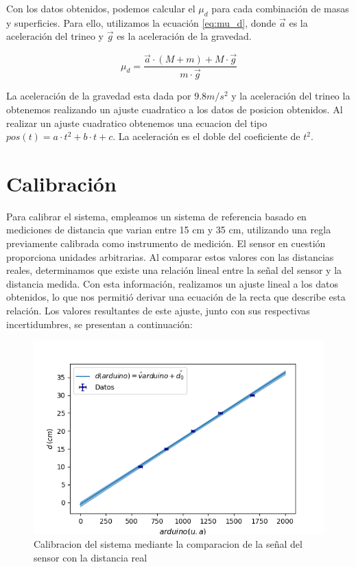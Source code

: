 \documentclass[12pt,a4]{article}
\begin{document}
Con los datos obtenidos, podemos calcular el $\mu_d$ para cada combinación de masas y superficies. Para ello, utilizamos la ecuación \ref{eq:mu_d}, donde $\vec{a}$ es la aceleración del trineo y $\vec{g}$ es la aceleración de la gravedad.

\begin{equation}
    \mu_d = \frac{\vec{a} \cdot (M + m) + M \cdot \vec{g} }{m \cdot \vec{g}}
    \label{eq:mu_d}
\end{equation}

La aceleración de la gravedad esta dada por $9.8 m/s^2$ y la aceleración del trineo la obtenemos realizando un ajuste cuadratico a los datos de posicion obtenidos. Al realizar un ajuste cuadratico obtenemos una ecuacion del tipo $pos(t) = a \cdot t^2 + b \cdot t + c$. La aceleración es el doble del coeficiente de $t^2$.

\section{Calibración}

Para calibrar el sistema, empleamos un sistema de referencia basado en mediciones de distancia que varian entre 15 cm y 35 cm, utilizando una regla previamente calibrada como
 instrumento de medición. El sensor en cuestión proporciona unidades arbitrarias. Al comparar estos valores con las distancias reales, determinamos que existe una relación lineal
  entre la señal del sensor y la distancia medida. Con esta información, realizamos un ajuste lineal a los datos obtenidos, lo que nos permitió derivar una ecuación de la recta que
   describe esta relación. Los valores resultantes de este ajuste, junto con sus respectivas incertidumbres, se presentan a continuación:

\begin{figure}[H]
    \centering
    \includegraphics[width=0.8\linewidth]{Calibracion.png}
    \caption{Calibracion del sistema mediante la comparacion de la señal del sensor con la distancia real}
    \label{fig:calibracion}
\end{figure}
\end{document}
